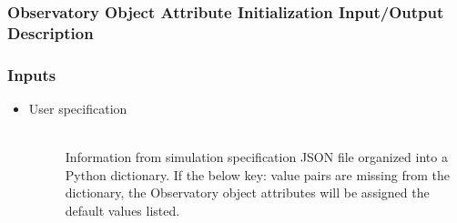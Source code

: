 \documentclass[cleanfoot]{asme2ej}
\begin{document}
\label{sec:observatorydefinition}
\subsubsection{Observatory Object Attribute Initialization Input/Output Description}

\subsubsection*{Inputs}
\begin{itemize}
    \item
    \begin{description}
        \item[User specification] \hfill \\
        Information from simulation specification JSON file organized into a Python dictionary. If the below key: value pairs are missing from the dictionary, the Observatory object attributes will be assigned the default values listed.
    \end{description}
\end{itemize}
\end{document}
